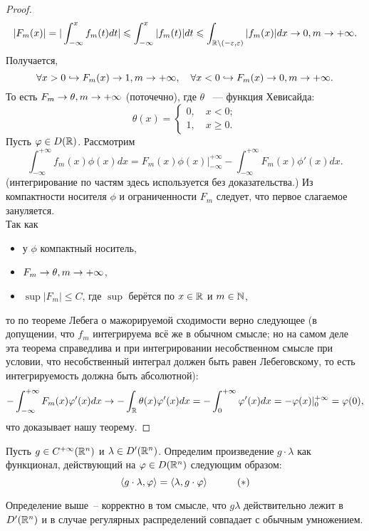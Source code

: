 \begin{proof}
    \[
    |F_m(x)| = |\int_{-\infty}^x f_m(t)dt| \leqslant \int_{-\infty}^x |f_m(t)|dt \leqslant \int_{\mathbb{R} \setminus (-\varepsilon, \varepsilon)} |f_m(x)|dx \rightarrow 0, m \rightarrow +\infty.
    \]
    Получается,
    \[
    \forall x > 0 \hookrightarrow F_m(x) \rightarrow 1, m \rightarrow +\infty, \quad \forall x < 0 \hookrightarrow F_m(x) \rightarrow 0, m \rightarrow +\infty.
    \]
    То есть $F_m \rightarrow \theta, m \rightarrow +\infty$ (поточечно), где $\theta$ ~--- функция Хевисайда:
    \[
    \theta(x) = \begin{cases}
                   0,\quad x < 0; \\
                   1,\quad x \geq 0.
        \end{cases}
    \]
    Пусть $\varphi \in D(\mathbb{R})$. Рассмотрим
    \[
        \int_{-\infty}^{+\infty} f_m(x)\phi(x)dx = F_m(x)\phi(x)\bigg|^{+\infty}_{-\infty} - \int_{-\infty}^{+\infty} F_m(x)\phi'(x)dx.
    \]
    (интегрирование по частям здесь используется без доказательства.)
    Из компактности носителя $\phi$ и ограниченности $F_m$ следует, что первое слагаемое зануляется.\\
    Так как 
    \begin{itemize}
        \item у $\phi$ компактный носитель,
        \item $F_m \rightarrow \theta, m \rightarrow +\infty$,
        \item $\sup |F_m| \leq C$, где $\sup$ берётся по $x\in \mathbb{R}$ и $m \in \mathbb{N}$,
    \end{itemize}
    то по теореме Лебега о мажорируемой сходимости верно следующее (в допущении, что $f_m$ интегрируема всё же в обычном смысле; но на самом деле эта теорема справедлива и при интегрировании несобственном смысле при условии, что несобственный интеграл должен быть равен Лебеговскому, то есть интегрируемость должна быть абсолютной):
    \[
        -\int_{-\infty}^{+\infty} F_m(x)\varphi'(x)dx \rightarrow -\int_{\mathbb{R}} \theta(x)\varphi'(x)dx = -\int_0^{+\infty} \varphi'(x)dx = -\varphi(x)|^{+\infty}_0 = \varphi(0),
    \]
    что доказывает нашу теорему.
\end{proof}
\begin{definition}
    Пусть $g \in C^{+\infty}(\mathbb{R}^n)$ и $\lambda \in D'(\mathbb{R}^n)$.
    Определим произведение $g\cdot\lambda$ как функционал, действующий на $\varphi \in D(\mathbb{R}^n)$ следующим образом:
    \[
        \langle g \cdot \lambda, \varphi \rangle = \langle \lambda, g \cdot \varphi \rangle \quad \tag{$\ast$}
    \]
\end{definition}
\begin{theorem}
    Определение выше~-- корректно в том смысле, что $g\lambda$ действительно лежит в $D'(\mathbb{R}^n)$ и в случае регулярных распределений совпадает с обычным умножением.
\end{theorem}
